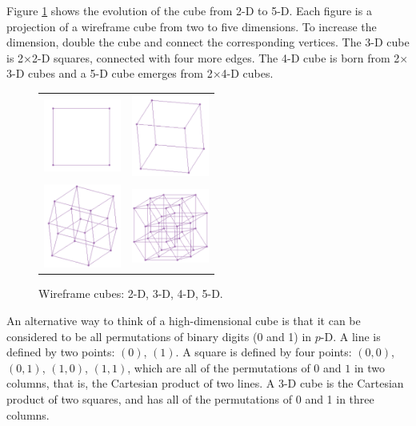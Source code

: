 Figure \ref{boxes} shows the evolution of the cube from 2-D to
5-D. Each figure is a projection of a wireframe cube from two to five
dimensions. To increase the dimension, double the cube and connect the
corresponding vertices. The 3-D cube is 2$\times$2-D squares,
connected with four more edges. The 4-D cube is born from 2$\times$3-D
cubes and a 5-D cube emerges from 2$\times$4-D cubes.

\begin{figure}[ht]
\centering
\begin{tabular}{c c}
\includegraphics[width=1in]{fig/cube2D.pdf} & \includegraphics[width=1in]{fig/cube3D.pdf} \\
\includegraphics[width=1in]{fig/cube4D.pdf} & \includegraphics[width=1in]{fig/cube5D.pdf}
\end{tabular}
\caption{Wireframe cubes: 2-D, 3-D, 4-D, 5-D.}
\label{boxes}
\end{figure}

An alternative way to think of a high-dimensional cube is that it can
be considered to be all permutations of binary digits (0 and 1) in
$p$-D. A line is defined by two points: $(0)$, $(1)$. A square is
defined by four points: $(0,0)$, $(0,1)$, $(1,0)$, $(1,1)$, which are
all of the permutations of $0$ and $1$ in two columns, that is, the
Cartesian product of two lines. A 3-D cube is the Cartesian product of
two squares, and has all of the permutations of 0 and 1 in three
columns.

